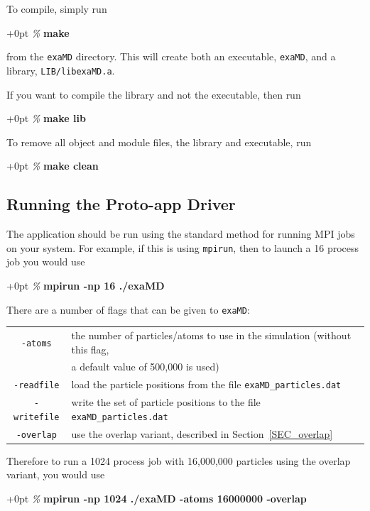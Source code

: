 \documentclass[paper=a4, fontsize=11pt,bibtotoc]{scrartcl}		%
\newenvironment{codebox}{\begin{MakeFramed}{\hsize0.8\linewidth\advance\hsize+0pt\FrameRestore}\normalfont\ttfamily}{\end{MakeFramed}}
\newcommand{\prompt}[1]{\textsl{\%} \textbf{#1}}
\newcommand{\TT}[1]{\texttt{#1}}
\begin{document}
To compile, simply run 
\begin{codebox}
        \prompt{make}
\end{codebox}
\noindent
from the \TT{exaMD} directory. This will create both an executable, \TT{exaMD}, and a library, \TT{LIB/libexaMD.a}.

If you want to compile the library and not the executable, then run 
\begin{codebox}
        \prompt{make lib}
\end{codebox}

\noindent
To remove all object and module files, the library and executable, run 
\begin{codebox}
        \prompt{make clean}
\end{codebox}


\subsection{Running the Proto-app Driver}

The application should be run using the standard method for running MPI jobs on your system. For example, if this is using \TT{mpirun}, then to 
launch a 16 process job you would use
\begin{codebox}
        \prompt{mpirun -np 16 ./exaMD}
\end{codebox}

\noindent
There are a number of flags that can be given to \TT{exaMD}:

\begin{tabular}{cl}
	\TT{-atoms}	& the number of particles/atoms to use in the simulation (without this flag, \\ 
                        & a default value of 500,000 is used)	\\
	\TT{-readfile}	& load the particle positions from the file \TT{exaMD\_particles.dat}	\\
	\TT{-writefile}	& write the set of particle positions to the file \TT{exaMD\_particles.dat}	\\
	\TT{-overlap}	& use the overlap variant, described in Section~\ref{SEC_overlap}	\\
\end{tabular}

\vspace{0.1in}
\noindent
Therefore to run a 1024 process job with 16,000,000 particles using the overlap variant, you would use
\begin{codebox}
        \prompt{mpirun -np 1024 ./exaMD -atoms 16000000 -overlap}
\end{codebox}
\end{document}
